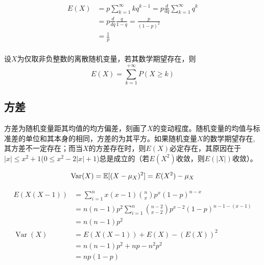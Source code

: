 \begin{example}[微分法求解几何分布均值]\label{ex:geometric_dist_mean}
    \begin{align*}
        E(X) & =p\sum_{k=1}^{\infty}k q^{k-1}=p\frac{d}{d q}\sum_{k=1}^{\infty} q^{k} \\
             & =p\frac{d}{d q} \frac{q}{1-q} =\frac{p}{(1-p)^{2}}                     \\
             & =\frac{1}{p}                                                           \\
    \end{align*}
\end{example}

\begin{proposition}\label{prop:mean_of_non-negative_discrete_varible}
    设$X$为仅取非负整数的离散随机变量，若其数学期望存在，则
    \[ E(X) = \sum_{k=1}^{+\infty}P(X \ge k) \]
\end{proposition}

\subsection{方差}

方差为随机变量距其均值的均方偏差，刻画了$X$的变动程度。随机变量的均值与标准差的单位和其本身的相同，方差的为其平方。如果随机变量$X$的数学期望存在, 其方差不一定存在；而当$X$的方差存在时，则$E(X)$必定存在，其原因在于$|x| \le x^2+1$($0 \le x^2-2|x|+1$)总是成立的（若$E(X^2)$收敛，则$E(|X|)$收敛）。

\begin{proposition}
    \[ \operatorname{Var}(X)=\mathbb{E}[(X-\mu_X)^2]=E(X^2)-\mu_X \]
\end{proposition}

\begin{example}[凑一法求解二项分布的方差]\label{ex:binom_dist_var}
    \begin{align*}
        E(X(X-1))             & =\sum_{i=1}^n x(x-1) \binom{n}{x} p^x (1-p)^{n-x}                   \\
                              & = n(n-1)p^2 \sum_{i=1}^n \binom{n-2}{x-2} p^{x-2} (1-p)^{n-1-(x-1)} \\
                              & =n(n-1)p^2                                                          \\
        \operatorname{Var}(X) & =  E(X(X-1)) + E(X) - (E(X))^2                                      \\
                              & = n(n-1)p^2 + np -n^2 p^2                                           \\
                              & =np(1-p)
    \end{align*}
\end{example}


